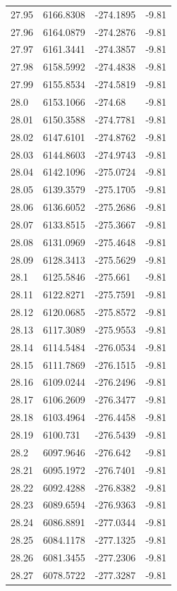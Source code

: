 \begin{table}[H]
\begin{tabular}{llll}
27.95 & 6166.8308 & -274.1895 & -9.81 \\
27.96 & 6164.0879 & -274.2876 & -9.81 \\
27.97 & 6161.3441 & -274.3857 & -9.81 \\
27.98 & 6158.5992 & -274.4838 & -9.81 \\
27.99 & 6155.8534 & -274.5819 & -9.81 \\
28.0 & 6153.1066 & -274.68 & -9.81 \\
28.01 & 6150.3588 & -274.7781 & -9.81 \\
28.02 & 6147.6101 & -274.8762 & -9.81 \\
28.03 & 6144.8603 & -274.9743 & -9.81 \\
28.04 & 6142.1096 & -275.0724 & -9.81 \\
28.05 & 6139.3579 & -275.1705 & -9.81 \\
28.06 & 6136.6052 & -275.2686 & -9.81 \\
28.07 & 6133.8515 & -275.3667 & -9.81 \\
28.08 & 6131.0969 & -275.4648 & -9.81 \\
28.09 & 6128.3413 & -275.5629 & -9.81 \\
28.1 & 6125.5846 & -275.661 & -9.81 \\
28.11 & 6122.8271 & -275.7591 & -9.81 \\
28.12 & 6120.0685 & -275.8572 & -9.81 \\
28.13 & 6117.3089 & -275.9553 & -9.81 \\
28.14 & 6114.5484 & -276.0534 & -9.81 \\
28.15 & 6111.7869 & -276.1515 & -9.81 \\
28.16 & 6109.0244 & -276.2496 & -9.81 \\
28.17 & 6106.2609 & -276.3477 & -9.81 \\
28.18 & 6103.4964 & -276.4458 & -9.81 \\
28.19 & 6100.731 & -276.5439 & -9.81 \\
28.2 & 6097.9646 & -276.642 & -9.81 \\
28.21 & 6095.1972 & -276.7401 & -9.81 \\
28.22 & 6092.4288 & -276.8382 & -9.81 \\
28.23 & 6089.6594 & -276.9363 & -9.81 \\
28.24 & 6086.8891 & -277.0344 & -9.81 \\
28.25 & 6084.1178 & -277.1325 & -9.81 \\
28.26 & 6081.3455 & -277.2306 & -9.81 \\
28.27 & 6078.5722 & -277.3287 & -9.81 \\

\end{tabular}
\end{table}
